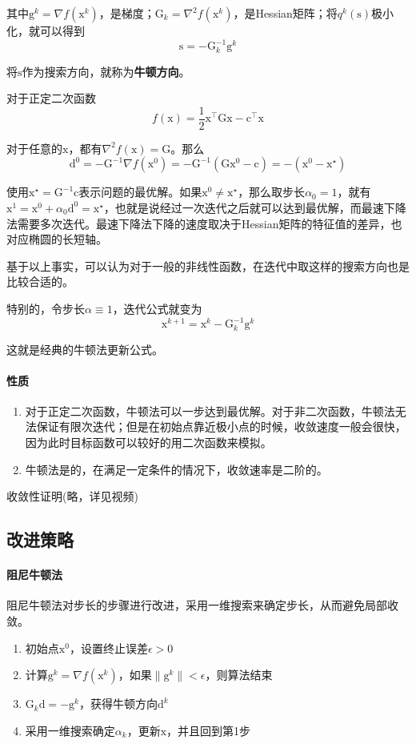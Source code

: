 \documentclass[a4paper]{D:/repositories/MyDGP/latex/PaperReadingLog}
\begin{document}
其中$\mathrm{g}^k=\nabla f(\mathrm{x}^k)$，是梯度；$\mathrm{G}_k=\nabla^2f(\mathrm{x}^k)$，是Hessian矩阵；将$q^k(\mathrm{s})$极小化，就可以得到
$$
\mathrm{s}=-\mathrm{G}_k^{-1}\mathrm{g}^k
$$

将$\mathrm{s}$作为搜索方向，就称为\textbf{牛顿方向}。

对于正定二次函数
$$
f(\mathrm{x})=\frac{1}{2}\mathrm{x}^\top \mathrm{G}\mathrm{x}-\mathrm{c}^\top\mathrm{x}
$$

对于任意的$\mathrm{x}$，都有$\nabla^2f(\mathrm{x})=\mathrm{G}$。那么
$$
\mathrm{d}^0=-\mathrm{G}^{-1}\nabla f(\mathrm{x}^0)=-\mathrm{G}^{-1}(\mathrm{G}\mathrm{x}^0-\mathrm{c})=-(\mathrm{x}^0-\mathrm{x}^\star)
$$

使用$\mathrm{x}^\star=\mathrm{G}^{-1}\mathrm{c}$表示问题的最优解。如果$\mathrm{x}^0\neq\mathrm{x}^\star$，那么取步长$\alpha_0=1$，就有$\mathrm{x}^1=\mathrm{x}^0+\alpha_0\mathrm{d}^0=\mathrm{x}^\star$，也就是说经过一次迭代之后就可以达到最优解，而最速下降法需要多次迭代。最速下降法下降的速度取决于Hessian矩阵的特征值的差异，也对应椭圆的长短轴。

基于以上事实，可以认为对于一般的非线性函数，在迭代中取这样的搜索方向也是比较合适的。

特别的，令步长$\alpha\equiv 1$，迭代公式就变为
$$
\mathrm{x}^{k+1}=\mathrm{x}^k-\mathrm{G}_k^{-1}\mathrm{g}^k
$$

这就是经典的牛顿法更新公式。

\paragraph{性质}
\begin{enumerate}
    \item 对于正定二次函数，牛顿法可以一步达到最优解。对于非二次函数，牛顿法无法保证有限次迭代；但是在初始点靠近极小点的时候，收敛速度一般会很快，因为此时目标函数可以较好的用二次函数来模拟。
    \item 牛顿法是的，在满足一定条件的情况下，收敛速率是二阶的。
\end{enumerate}

收敛性证明(略，详见视频)

\subsection{改进策略}
\paragraph{阻尼牛顿法}
阻尼牛顿法对步长的步骤进行改进，采用一维搜索来确定步长，从而避免局部收敛。
\begin{enumerate}
    \item {}初始点$\mathrm{x}^0$，设置终止误差$\epsilon>0$
    \item 计算$\mathrm{g}^k=\nabla f(\mathrm{x}^k)$，如果$\lVert \mathrm{g}^k \lVert <\epsilon$，则算法结束
    \item {}$\mathrm{G}_k\mathrm{d}=-\mathrm{g}^k$，获得牛顿方向$\mathrm{d}^k$
    \item 采用一维搜索确定$\alpha_k$，更新$\mathrm{x}$，并且回到第1步
\end{enumerate}
\end{document}
